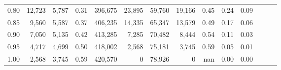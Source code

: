 \begin{tabular}{rrrrrrrrrrrrrr}
0.80 &  12,723 &  5,787 &  0.31 &  396,675 &   23,895 &  59,760 &  19,166 &  0.45 &  0.24 &      0.09 \\
0.85 &   9,560 &  5,587 &  0.37 &  406,235 &   14,335 &  65,347 &  13,579 &  0.49 &  0.17 &      0.06 \\
0.90 &   7,050 &  5,135 &  0.42 &  413,285 &    7,285 &  70,482 &   8,444 &  0.54 &  0.11 &      0.03 \\
0.95 &   4,717 &  4,699 &  0.50 &  418,002 &    2,568 &  75,181 &   3,745 &  0.59 &  0.05 &      0.01 \\
1.00 &   2,568 &  3,745 &  0.59 &  420,570 &        0 &  78,926 &       0 &   nan &  0.00 &      0.00 \\
\bottomrule
\end{tabular}
